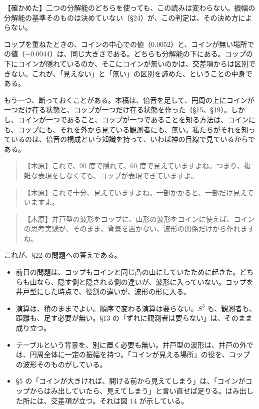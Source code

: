 \documentclass[
  a4paper,
]{ltjsarticle}
\providecommand{\tightlist}{%
  \setlength{\itemsep}{0pt}\setlength{\parskip}{0pt}}
\begin{document}
【確かめた】二つの分解能のどちらを使っても、この読みは変わらない。振幅の分解能の基準そのものは決めていない（§24）が、この判定は、その決め方によらない。

コップを重ねたときの、コインの中心での値（0.0052）と、コインが無い場所での値（−0.0044）は、同じ大きさである。どちらも分解能の下にある。コップの下にコインが隠れているのか、そこにコインが無いのかは、交差項からは区別できない。これが、「見えない」と「無い」の区別を諦めた、ということの中身である。

もう一つ、断っておくことがある。本稿は、倍音を足して、円周の上にコインが一つだけ在る状態と、コップが一つだけ在る状態を作った（§15、§19）。しかし、コインが一つであること、コップが一つであることを知る方法は、コインにも、コップにも、それを外から見ている観測者にも、無い。私たちがそれを知っているのは、倍音の構成という知識を持って、いわば神の目線で見ているからである。

\begin{quote}
【木原】これで、90 度で隠れて、60
度で見えていますよね。つまり、複雑な表現をしなくても、コップが表現できていますよ。
\end{quote}

\begin{quote}
【木原】これで十分、見えていますよね。一部かかると、一部だけ見えていますよ。
\end{quote}

\begin{quote}
【木原】井戸型の波形をコップに、山形の波形をコインに使えば、コインの思考実験が、そのまま、背景を置かない、波形の関係だけから作れますね。
\end{quote}

これが、§22 の問題への答えである。

\begin{itemize}
\tightlist
\item
  前日の問題は、コップもコインと同じ凸の山にしていたために起きた。どちらも山なら、隠す側と隠される側の違いが、波形に入っていない。コップを井戸型にした時点で、役割の違いが、波形の形に入る。
\item
  演算は、積のままでよい。順序で変わる演算は要らない。\(S^3\)
  も、観測者も、距離も、足す必要が無い。§13
  の「ずれに観測者は要らない」は、そのまま成り立つ。
\item
  テーブルという背景を、別に置く必要も無い。井戸型の波形は、井戸の外では、円周全体に一定の振幅を持つ。「コインが見える場所」の役を、コップの波形そのものがしている。
\item
  §5
  の「コインが大きければ、開ける前から見えてしまう」は、「コインがコップからはみ出していたら、見えてしまう」と言い直せば足りる。はみ出した所には、交差項が立つ。それは図
  14 が示している。
\end{itemize}
\end{document}

